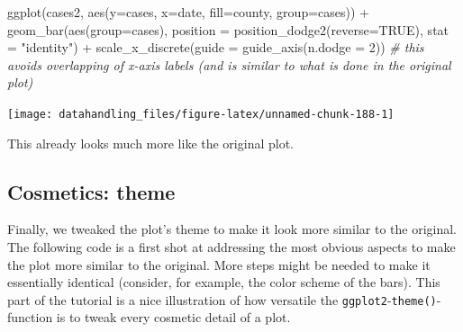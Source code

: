 \documentclass[
  12pt,
]{style/krantz}
\newenvironment{Shaded}{\begin{snugshade}}{\end{snugshade}}
\newcommand{\AttributeTok}[1]{\textcolor[rgb]{0.77,0.63,0.00}{#1}}
\newcommand{\CommentTok}[1]{\textcolor[rgb]{0.56,0.35,0.01}{\textit{#1}}}
\newcommand{\ConstantTok}[1]{\textcolor[rgb]{0.00,0.00,0.00}{#1}}
\newcommand{\DecValTok}[1]{\textcolor[rgb]{0.00,0.00,0.81}{#1}}
\newcommand{\FunctionTok}[1]{\textcolor[rgb]{0.00,0.00,0.00}{#1}}
\newcommand{\NormalTok}[1]{#1}
\newcommand{\SpecialCharTok}[1]{\textcolor[rgb]{0.00,0.00,0.00}{#1}}
\newcommand{\StringTok}[1]{\textcolor[rgb]{0.31,0.60,0.02}{#1}}
\begin{document}
\begin{Shaded}
\begin{Highlighting}[]
\FunctionTok{ggplot}\NormalTok{(cases2, }\FunctionTok{aes}\NormalTok{(}\AttributeTok{y=}\NormalTok{cases, }\AttributeTok{x=}\NormalTok{date, }\AttributeTok{fill=}\NormalTok{county, }\AttributeTok{group=}\NormalTok{cases)) }\SpecialCharTok{+}
  \FunctionTok{geom\_bar}\NormalTok{(}\FunctionTok{aes}\NormalTok{(}\AttributeTok{group=}\NormalTok{cases), }\AttributeTok{position =} \FunctionTok{position\_dodge2}\NormalTok{(}\AttributeTok{reverse=}\ConstantTok{TRUE}\NormalTok{), }\AttributeTok{stat =} \StringTok{"identity"}\NormalTok{) }\SpecialCharTok{+}
    \FunctionTok{scale\_x\_discrete}\NormalTok{(}\AttributeTok{guide =} \FunctionTok{guide\_axis}\NormalTok{(}\AttributeTok{n.dodge =} \DecValTok{2}\NormalTok{))  }\CommentTok{\# this avoids overlapping of x{-}axis labels (and is similar to what is done in the original plot)}
\end{Highlighting}
\end{Shaded}

\texttt{[image: datahandling\_files/figure-latex/unnamed-chunk-188-1]}

This already looks much more like the original plot.

\hypertarget{cosmetics-theme}{%
\subsection{Cosmetics: theme}\label{cosmetics-theme}}

Finally, we tweaked the plot's theme to make it look more similar to the original. The following code is a first shot at addressing the most obvious aspects to make the plot more similar to the original. More steps might be needed to make it essentially identical (consider, for example, the color scheme of the bars). This part of the tutorial is a nice illustration of how versatile the \texttt{ggplot2}-\texttt{theme()}-function is to tweak every cosmetic detail of a plot.
\end{document}
